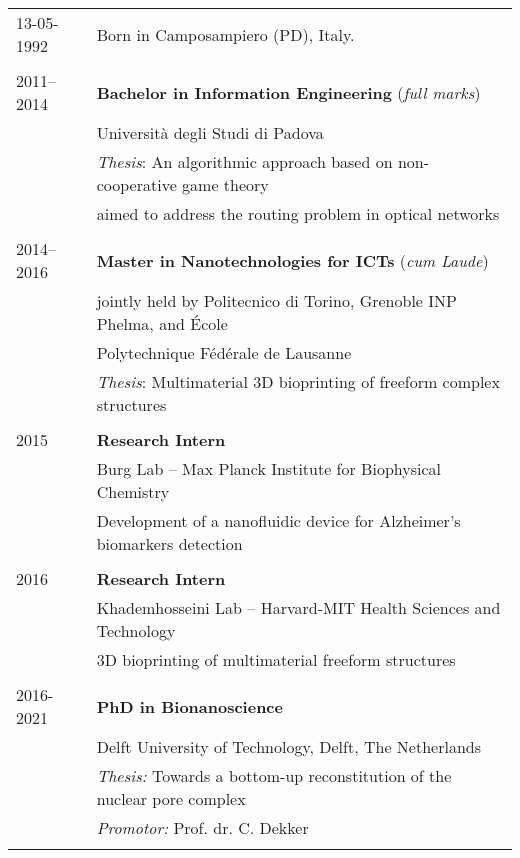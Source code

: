 \begin{tabular}{p{}l}
	
	13-05-1992 & Born in Camposampiero (PD), Italy.\\
	\\
    2011--2014 & \textbf{Bachelor in Information Engineering} (\emph{full marks})\\
    & Universit\`{a} degli Studi di Padova\\
    & \emph{Thesis}: An algorithmic approach based on non-cooperative game theory\\ &\hspace{2pt}aimed to address the routing problem in optical networks \\
    \\
    2014--2016 & \textbf{Master in Nanotechnologies for ICTs} (\emph{cum Laude}) \\
    & jointly held by Politecnico di Torino, Grenoble INP Phelma, and \'{E}cole  \\
    &Polytechnique F\'{e}d\'{e}rale de Lausanne \\
    &\emph{Thesis}: Multimaterial 3D bioprinting of freeform complex structures \\
    \\
    2015 & \textbf{Research Intern} \\
    & Burg Lab – Max Planck Institute for Biophysical Chemistry \\
    & Development of a nanofluidic device for Alzheimer's biomarkers detection\\
    \\2016 & \textbf{Research Intern} \\
    & Khademhosseini Lab – Harvard-MIT Health Sciences and Technology \\
    & 3D bioprinting of multimaterial freeform structures \\
    \\
     2016-2021 & \textbf{PhD in Bionanoscience} \\
    & Delft University of Technology, Delft, The Netherlands \\
    & \emph{Thesis:} Towards a bottom-up reconstitution of the nuclear pore complex\\
    & \emph{Promotor:} Prof. dr. C. Dekker\\
    \\
    

\end{tabular}
